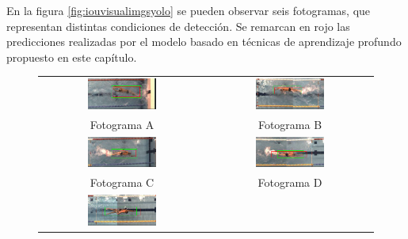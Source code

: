 En la figura \ref{fig:iouvisualimgsyolo} se pueden observar seis fotogramas, que representan distintas condiciones de detección. Se remarcan en rojo las predicciones realizadas por el modelo basado en técnicas de aprendizaje profundo propuesto en este capítulo.

\begin{figure}[h!]
    \centering
    \begin{tabular}{cc}
          \includegraphics[width=0.43\textwidth,height=0.43\textheight,keepaspectratio]{imagenes/parte_IA/iou_visual/1099_recortada.png} &
          \includegraphics[width=0.43\textwidth,height=0.43\textheight,keepaspectratio]{imagenes/parte_IA/iou_visual/1259_recortada.png}
          \\ Fotograma A   & Fotograma B \\
          \includegraphics[width=0.43\textwidth,height=0.43\textheight,keepaspectratio]{imagenes/parte_IA/iou_visual/1014_recortada.png} &
          \includegraphics[width=0.43\textwidth,height=0.43\textheight,keepaspectratio]{imagenes/parte_IA/iou_visual/897_recortada.png}
          \\ Fotograma C & Fotograma D \\
          \includegraphics[width=0.43\textwidth,height=0.43\textheight,keepaspectratio]{imagenes/parte_IA/iou_visual/611_recortada.png} &

\end{tabular}
\end{figure}
